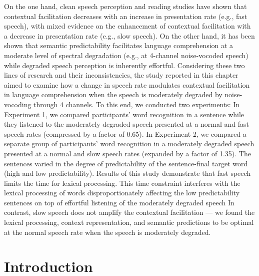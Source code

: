 \documentclass[a4paper, nobind]{templates/ociamthesis}
\begin{document}
On the one hand, clean speech perception and reading studies have shown that contextual facilitation decreases with an increase in presentation rate (e.g., fast speech), with mixed evidence on the enhancement of contextual facilitation with a decrease in presentation rate (e.g., slow speech).
On the other hand, it has been shown that semantic predictability facilitates language comprehension at a moderate level of spectral degradation (e.g., at 4-channel noise-vocoded speech) while degraded speech perception is inherently effortful.
Considering these two lines of research and their inconsistencies,
the study reported in this chapter aimed to examine how a change in speech rate modulates contextual facilitation in language comprehension when the speech is moderately degraded by noise-vocoding through 4 channels.
To this end, we conducted two experiments:
In Experiment 1, we compared participants' word recognition in a sentence while they listened to the moderately degraded speech presented at a normal and fast speech rates (compressed by a factor of 0.65).
In Experiment 2, we compared a separate group of participants' word recognition in a moderately degraded speech presented at a normal and slow speech rates (expanded by a factor of 1.35).
The sentences varied in the degree of predictability of the sentence-final target word (high and low predictability).
Results of this study demonstrate that fast speech limits the time for lexical processing.
This time constraint interferes with the lexical processing of words disproportionately affecting the low predictability sentences on top of effortful listening of the moderately degraded speech
In contrast, slow speech does not amplify the contextual facilitation --- we found the lexical processing, context representation, and semantic predictions to be optimal at the normal speech rate when the speech is moderately degraded.

\hypertarget{introduction-2}{%
\section{Introduction}\label{introduction-2}}
\end{document}
